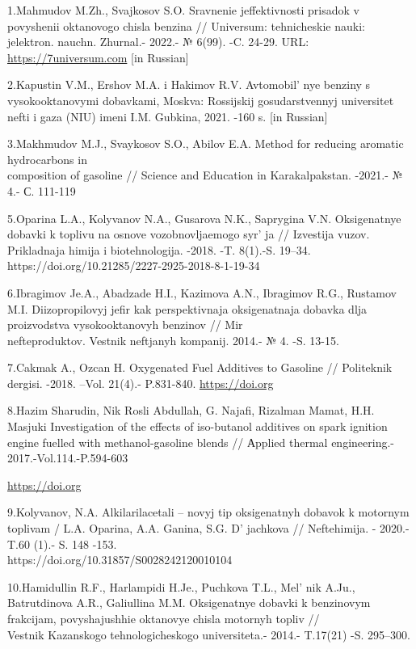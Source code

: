 \begin{references}
1.Mahmudov M.Zh., Svajkosov S.O. Sravnenie jeffektivnosti prisadok v
povyshenii oktanovogo chisla benzina // Universum: tehnicheskie nauki:
jelektron. nauchn. Zhurnal.- 2022.- № 6(99). -C. 24-29. URL:
\href{https://7universum.com/ru/tech/archive/item/14001}{https://7universum.com} {[}in Russian{]}

2.Kapustin V.M., Ershov M.A. i Hakimov R.V.
Avtomobil' nye benziny s vysokooktanovymi dobavkami,
Moskva: Rossijskij gosudarstvennyj universitet nefti i gaza (NIU) imeni
I.M. Gubkina, 2021. -160 s. {[}in Russian{]}

3.Makhmudov M.J., Svaykosov S.O., Abilov E.A. Method for reducing
aromatic hydrocarbons in \\composition of gasoline // Science and
Education in Karakalpakstan. -2021.- № 4.- С. 111-119

5.Oparina L.A., Kolyvanov N.A., Gusarova N.K., Saprygina V.N.
Oksigenatnye dobavki k toplivu na osnove vozobnovljaemogo
syr' ja // Izvestija vuzov. Prikladnaja himija i
biotehnologija. -2018. -T. 8(1).-S. 19--34.
https://doi.org/10.21285/2227-2925-2018-8-1-19-34

6.Ibragimov Je.A., Abadzade H.I., Kazimova A.N., Ibragimov R.G.,
Rustamov M.I. Diizopropilovyj jefir kak perspektivnaja oksigenatnaja
dobavka dlja proizvodstva vysokooktanovyh benzinov // Mir
\\nefteproduktov. Vestnik neftjanyh kompanij. 2014.- № 4. -S. 13-15.

7.Cakmak A., Ozcan H. Oxygenated Fuel Additives to Gasoline //
Politeknik dergisi. -2018. --Vol. 21(4).- P.831-840.
\href{https://doi.org/10.2339/politeknik.457956}{https://doi.org}

8.Hazim Sharudin, Nik Rosli Abdullah, G. Najafi, Rizalman Mamat, H.H.
Masjuki Investigation of the effects of iso-butanol additives on spark
ignition engine fuelled with methanol-gasoline blends // Аpplied thermal
engineering.- 2017.-Vol.114.-P.594-603

\href{https://doi.org/10.1016/j.applthermaleng.2016.12.017}{https://doi.org}

9.Kolyvanov, N.A. Alkilarilacetali -- novyj tip oksigenatnyh dobavok k
motornym toplivam / L.A. Oparina, A.A. Ganina, S.G.
D' jachkova // Neftehimija. - 2020.- T.60 (1).- S. 148
-153. \\https://doi.org/10.31857/S0028242120010104

10.Hamidullin R.F., Harlampidi H.Je., Puchkova T.L.,
Mel' nik A.Ju., Batrutdinova A.R., Galiullina M.M.
Oksigenatnye dobavki k benzinovym frakcijam, povyshajushhie oktanovye
chisla motornyh topliv // \\Vestnik Kazanskogo tehnologicheskogo
universiteta.- 2014.- T.17(21) -S. 295--300.


\end{references}
